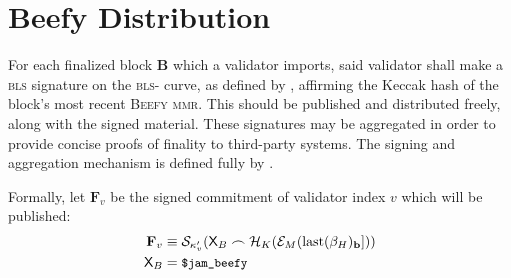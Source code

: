 \section{Beefy Distribution}\label{sec:beefy}

For each finalized block $\mathbf{B}$ which a validator imports, said validator shall make a \textsc{bls} signature on the \textsc{bls}- curve, as defined by \cite{bls12-381}, affirming the Keccak hash of the block's most recent \textsc{Beefy} \textsc{mmr}. This should be published and distributed freely, along with the signed material. These signatures may be aggregated in order to provide concise proofs of finality to third-party systems. The signing and aggregation mechanism is defined fully by \cite{cryptoeprint:2022/1611}.

Formally, let $\mathbf{F}_v$ be the signed commitment of validator index $v$ which will be published:
\begin{align}\label{eq:beefysignedcommitment}
  \mathbf{F}_v &\equiv \mathcal{S}_{\kappa'_v}(\mathsf{X}_B\frown\mathcal{H}_K(\mathcal{E}_M(\text{last}(\beta_H)_\mathbf{b}]))\\
  \mathsf{X}_B &= \text{{\small \texttt{\$jam\_beefy}}}
\end{align}
